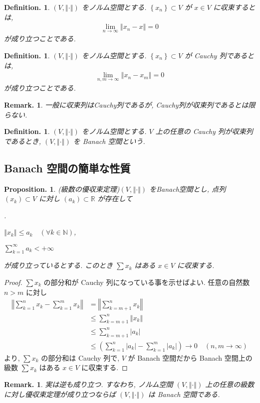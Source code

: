 \documentclass[openany, a4paper, oneside]{jsbook}
\newcounter{enum2}
\renewenvironment{enumerate}{%
\begin{list}%
{%
\arabic{enum2}.\ \,%
}%
{%
\usecounter{enum2}
\setlength{\itemindent}{0pt}%
\setlength{\leftmargin}{15pt}%
\setlength{\rightmargin}{0pt}%
\setlength{\labelsep}{0pt}%
\setlength{\labelwidth}{6pt}%
\setlength{\itemsep}{0pt}%
\setlength{\parsep}{0pt}%
\setlength{\listparindent}{0pt}%
}
}{%
\end{list}%
}
\theoremstyle{break}
\newtheorem{prop}[thm]{Proposition.}
\theoremstyle{breakdefn}
\newtheorem{defn}[thm]{Definition.}
\newtheorem{rem}[thm]{Remark.}
\newcommand{\abs}[1]{\left|#1\right|}
\newcommand{\norm}[1]{\left\Vert#1\right\Vert}
\newcommand{\rbk}[1]{\left (#1\right)}
\newcommand{\cbk}[1]{\left\{#1\right\}}
\newcommand{\bbN}{\mathbb{N}}
\newcommand{\bbR}{\mathbb{R}}
\begin{document}
\begin{defn}
 $(V, \norm{\cdot})$ をノルム空間とする.
 $\cbk{x_n} \subset V$ が $x \in V$ に収束するとは,
 \begin{align*}
  \lim_{n \to \infty} \norm{x_n - x}
  =
  0
 \end{align*}
が成り立つことである.
\end{defn}
\begin{defn}
 $(V, \norm{\cdot})$ をノルム空間とする.
 $\cbk{x_n} \subset V$ が Cauchy 列であるとは,
  \begin{align*}
   \lim_{n, m \to \infty} \norm{x_n - x_m}
   =
   0
  \end{align*}
 が成り立つことである.
\end{defn}
\begin{rem}
一般に収束列はCauchy列であるが, Cauchy列が収束列であるとは限らない.
\end{rem}
\begin{defn}
 $(V, \norm{\cdot})$ をノルム空間とする.
 $V$ 上の任意の Cauchy 列が収束列であるとき, $(V, \norm{\cdot})$ を Banach 空間という.
\end{defn}
\subsection{Banach 空間の簡単な性質}


\begin{prop}(級数の優収束定理)\label{introductory-study-function-spaces1}
 $(V, \norm{\cdot})$ をBanach空間とし, 点列 $\rbk{x_k} \subset V$ に対し $\rbk{a_k} \subset \bbR$ が存在して
\begin{enumerate}
\item $\norm{x_k} \leq a_k \quad (\forall k \in \bbN)$,
\item $\sum_{k=1}^{\infty} a_k < +\infty$
\end{enumerate}
 が成り立っているとする.
 このとき $\sum x_k$ はある $x \in V$ に収束する.
\end{prop}
\begin{proof}
$\sum x_k$ の部分和が Cauchy 列になっている事を示せばよい.
任意の自然数 $n > m$ に対し
\begin{align*}
 \norm{\sum_{k=1}^{n} x_k - \sum_{k=1}^{m} x_k}
 &=
 \norm{\sum_{k=m+1}^{n} x_k} \\
 &\leq
 \sum_{k=m+1}^{n} \norm{x_k} \\
 &\leq
 \sum_{k=m+1}^{n} \abs{a_k} \\
 &\leq
 \rbk{\sum_{k=1}^{n} \abs{a_k} - \sum_{k=1}^{m} \abs{a_k}} \to 0 \quad (n, m \to \infty)
\end{align*}
より, $\sum x_k$ の部分和は Cauchy 列で, $V$ が Banach 空間だから
Banach 空間上の級数 $\sum x_k$ はある $x\in V$ に収束する.
\end{proof}
\begin{rem}
実は逆も成り立つ.
すなわち, ノルム空間 $(V, \norm{\cdot})$ 上の任意の級数に対し優収束定理が成り立つならば $(V, \norm{\cdot})$ は Banach 空間である.
\end{rem}
\end{document}
